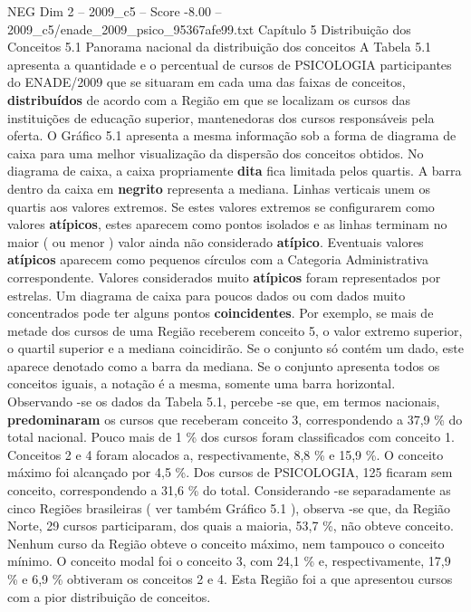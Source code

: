 \begin{textsample}{NEG Dim 2 – 2009\_c5 – Score -8.00 – 2009\_c5/enade\_2009\_psico\_95367afe99.txt}  \label{ex:f2_neg_014}
Capítulo 5 Distribuição dos Conceitos 5.1 Panorama nacional da distribuição dos conceitos A Tabela 5.1 apresenta a quantidade e o percentual de cursos de PSICOLOGIA participantes do ENADE/2009 que se situaram em cada uma das faixas de conceitos, \textbf{distribuídos} de acordo com a Região em que se localizam os cursos das instituições de educação superior, mantenedoras dos cursos responsáveis pela oferta.
O Gráfico 5.1 apresenta a mesma informação sob a forma de diagrama de caixa para uma melhor visualização da dispersão dos conceitos obtidos.
No diagrama de caixa, a caixa propriamente \textbf{dita} fica limitada pelos quartis.
A barra dentro da caixa em \textbf{negrito} representa a mediana.
Linhas verticais unem os quartis aos valores extremos.
Se estes valores extremos se configurarem como valores \textbf{atípicos}, estes aparecem como pontos isolados e as linhas terminam no maior ( ou menor ) valor ainda não considerado \textbf{atípico}.
Eventuais valores \textbf{atípicos} aparecem como pequenos círculos com a Categoria Administrativa correspondente.
Valores considerados muito \textbf{atípicos} foram representados por estrelas.
Um diagrama de caixa para poucos dados ou com dados muito concentrados pode ter alguns pontos \textbf{coincidentes}.
Por exemplo, se mais de metade dos cursos de uma Região receberem conceito 5, o valor extremo superior, o quartil superior e a mediana coincidirão.
Se o conjunto só contém um dado, este aparece denotado como a barra da mediana.
Se o conjunto apresenta todos os conceitos iguais, a notação é a mesma, somente uma barra horizontal.
Observando -se os dados da Tabela 5.1, percebe -se que, em termos nacionais, \textbf{predominaram} os cursos que receberam conceito 3, correspondendo a 37,9 \% do total nacional.
Pouco mais de 1 \% dos cursos foram classificados com conceito 1.
Conceitos 2 e 4 foram alocados a, respectivamente, 8,8 \% e 15,9 \%.
O conceito máximo foi alcançado por 4,5 \%.
Dos cursos de PSICOLOGIA, 125 ficaram sem conceito, correspondendo a 31,6 \% do total.
Considerando -se separadamente as cinco Regiões brasileiras ( ver também Gráfico 5.1 ), observa -se que, da Região Norte, 29 cursos participaram, dos quais a maioria, 53,7 \%, não obteve conceito.
Nenhum curso da Região obteve o conceito máximo, nem tampouco o conceito mínimo.
O conceito modal foi o conceito 3, com 24,1 \% e, respectivamente, 17,9 \% e 6,9 \% obtiveram os conceitos 2 e 4.
Esta Região foi a que apresentou cursos com a pior distribuição de conceitos.

\end{textsample}
